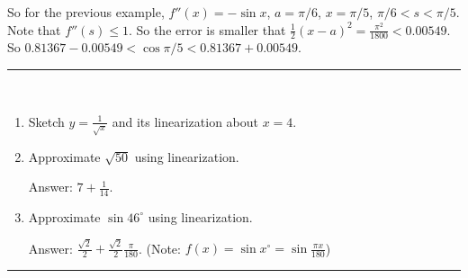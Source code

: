 \documentclass[../calc1-main.tex]{subfiles}
\begin{document}
So for the previous example, $f''(x) = -\sin x$, $a=\pi/6$, $x=\pi/5$, $\pi/6<s<\pi/5$. Note that $f''(s) \le 1$. So the error is smaller that $\frac{1}{2}(x-a)^2 = \frac{\pi^2}{1800}<0.00549$. So $0.81367 -0.00549 < \cos \pi/5 < 0.81367 + 0.00549$.

\rule{\textwidth}{1pt}
\begin{multicols}{2}
\begin{exercise}
~\\
  \begin{enumerate}
    \item Sketch $y=\frac{1}{\sqrt{x}}$ and its linearization about $x=4$.
    \item Approximate $\sqrt{50}$ using linearization.

    Answer: $7+ \frac{1}{14}$.
    \item Approximate $\sin 46^{\circ}$ using linearization.

    Answer: $\frac{\sqrt{2}}{2} + \frac{\sqrt{2}}{2} \frac{\pi}{180}$. (Note: $f(x) = \sin x^{\circ} = \sin \frac{\pi x}{180}$)
  \end{enumerate}
\end{exercise}
\end{multicols}
\rule{\textwidth}{1pt}
\end{document}
